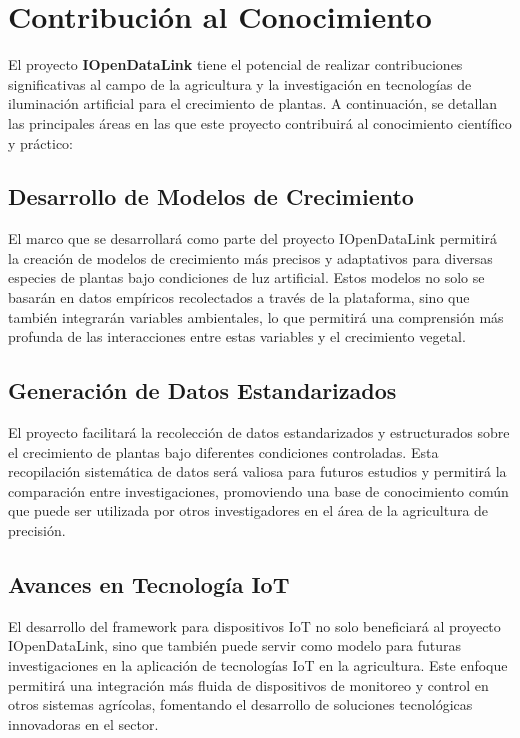 
\section{Contribución al Conocimiento}

El proyecto \textbf{IOpenDataLink} tiene el potencial de realizar contribuciones significativas al campo de la agricultura y la investigación en tecnologías de iluminación artificial para el crecimiento de plantas. A continuación, se detallan las principales áreas en las que este proyecto contribuirá al conocimiento científico y práctico:

\subsection{Desarrollo de Modelos de Crecimiento}
El marco que se desarrollará como parte del proyecto IOpenDataLink permitirá la creación de modelos de crecimiento más precisos y adaptativos para diversas especies de plantas bajo condiciones de luz artificial. Estos modelos no solo se basarán en datos empíricos recolectados a través de la plataforma, sino que también integrarán variables ambientales, lo que permitirá una comprensión más profunda de las interacciones entre estas variables y el crecimiento vegetal.

\subsection{Generación de Datos Estandarizados}
El proyecto facilitará la recolección de datos estandarizados y estructurados sobre el crecimiento de plantas bajo diferentes condiciones controladas. Esta recopilación sistemática de datos será valiosa para futuros estudios y permitirá la comparación entre investigaciones, promoviendo una base de conocimiento común que puede ser utilizada por otros investigadores en el área de la agricultura de precisión.

\subsection{Avances en Tecnología IoT}
El desarrollo del framework para dispositivos IoT no solo beneficiará al proyecto IOpenDataLink, sino que también puede servir como modelo para futuras investigaciones en la aplicación de tecnologías IoT en la agricultura. Este enfoque permitirá una integración más fluida de dispositivos de monitoreo y control en otros sistemas agrícolas, fomentando el desarrollo de soluciones tecnológicas innovadoras en el sector.

